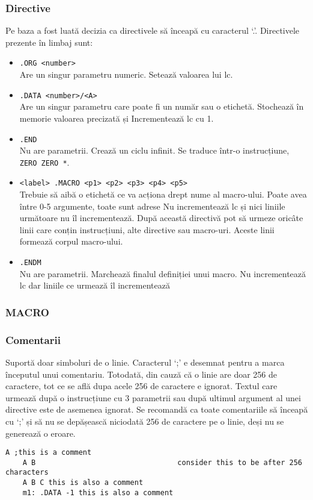 \documentclass[../main.tex]{subfiles}
\begin{document}
\subsubsection{Directive}
Pe baza \cite{asl} a fost luată decizia ca directivele să înceapă cu caracterul `.'. Directivele prezente în limbaj sunt:
\begin{itemize}
    \item \verb|.ORG <number>|\\
    Are un singur parametru numeric. Setează valoarea lui \acrshort{lc}.
    \item \verb|.DATA <number>/<A>|\\
    Are un singur parametru care poate fi un număr sau o etichetă. Stochează în memorie valoarea precizată și 
    Incrementează \acrshort{lc} cu 1.
    \item \verb|.END|\\
    Nu are parametrii. Crează un ciclu infinit. Se traduce într-o instrucțiune, \texttt{ZERO ZERO *}.
    \item \verb|<label> .MACRO <p1> <p2> <p3> <p4> <p5>|\\
    Trebuie să aibă o etichetă ce va acționa drept nume al macro-ului. Poate avea între 0-5 argumente, toate sunt adrese
    Nu incrementează \acrshort{lc} și nici liniile următoare nu îl incrementează. După această directivă pot să
    urmeze oricâte linii care conțin instrucțiuni, alte directive sau macro-uri. Aceste linii formează corpul
    macro-ului.
    \item \verb|.ENDM|\\
    Nu are parametrii. Marchează finalul definiției unui macro. Nu incrementează \acrshort{lc} dar liniile ce urmează
    îl incrementează
\end{itemize}

\subsubsection{MACRO}

\subsubsection{Comentarii}
Suportă doar simboluri de o linie. Caracterul `;' e desemnat pentru a marca începutul unui comentariu. Totodată,
din cauză că o linie are doar 256 de caractere, tot ce se află dupa acele 256 de caractere e ignorat. Textul care urmează
după o instrucțiune cu 3 parametrii sau după ultimul argument al unei directive este de asemenea ignorat. Se recomandă
ca toate comentariile să înceapă cu `;' și să nu se depășească niciodată 256 de caractere pe o linie, deși nu se
generează o eroare.
\begin{lstlisting}[caption={Exemplu de comentarii}, label={lst:comment}]
    A ;this is a comment
    A B                                 consider this to be after 256 characters
    A B C this is also a comment
    m1: .DATA -1 this is also a comment
\end{lstlisting}
\end{document}
